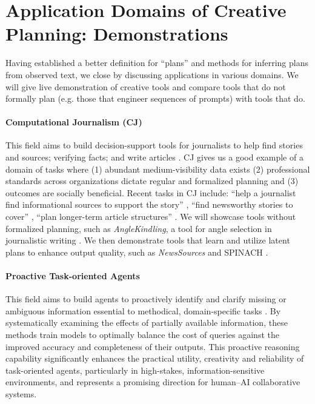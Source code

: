 \documentclass[11pt]{article}
\begin{document}
\section{Application Domains of Creative Planning: Demonstrations}

Having established a better definition for ``plans'' and methods for inferring plans from observed text, we close by discussing applications in various domains. We will give live demonstration of creative tools and compare tools that do not formally plan (e.g. those that engineer sequences of prompts) with tools that do.

\paragraph{Computational Journalism (CJ)} This field aims to build decision-support tools for journalists to help find stories and sources; verifying facts; and write articles \cite{cohen2011computational}. CJ gives us a good example of a domain of tasks where (1) abundant medium-visibility data exists (2) professional standards across organizations dictate regular and formalized planning and (3) outcomes are socially beneficial. Recent tasks in CJ include: ``help a journalist find informational sources to support the story'' \cite{huang2024anovel, spangher2023identifying, spangher2024explaining, lu2024newsinterview}, ``find newsworthy stories to cover'' \cite{spangher-etal-2024-tracking, welsh2024explaining, diakopoulos2010diamonds}, ``plan longer-term article structures'' \cite{spangher2022sequentially, spangher2021multitask, choubey2020discourse}. We will showcase tools without formalized planning, such as \textit{AngleKindling}, a tool for angle selection in journalistic writing \cite{petridis2023anglekindling}. We then demonstrate tools that learn and utilize latent plans to enhance output quality, such as \textit{NewsSources} \cite{huang2024anovel} and SPINACH \cite{liu2024spinach}.

\paragraph{Proactive Task-oriented Agents} This field aims to build agents to proactively identify and clarify missing or ambiguous information essential to methodical, domain-specific tasks \cite{lu2024newsinterview, wu2025collabllmpassiverespondersactive,liu2025proactiveconversationalagentsinner}. By systematically examining the effects of partially available information, these methods train models to optimally balance the cost of queries against the improved accuracy and completeness of their outputs. This proactive reasoning capability significantly enhances the practical utility, creativity and reliability of task-oriented agents, particularly in high-stakes, information-sensitive environments, and represents a promising direction for human–AI collaborative systems.
\end{document}
